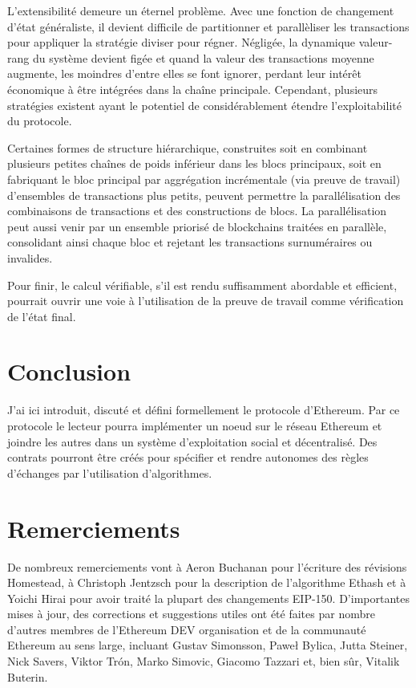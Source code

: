 \documentclass[9pt,oneside]{amsart}
\begin{document}
\begin{multicols}{2}
L'extensibilité demeure un éternel problème. Avec une fonction de changement d'état généraliste, il devient difficile de partitionner et parallèliser les transactions pour appliquer la stratégie diviser pour régner. Négligée, la dynamique valeur-rang du système devient figée et quand la valeur des transactions moyenne augmente, les moindres d'entre elles se font ignorer, perdant leur intérêt économique à être intégrées dans la chaîne principale. Cependant, plusieurs stratégies existent ayant le potentiel de considérablement étendre l'exploitabilité du protocole.

Certaines formes de structure hiérarchique, construites soit en combinant plusieurs petites chaînes de poids inférieur dans les blocs principaux, soit en fabriquant le bloc principal par aggrégation incrémentale (via preuve de travail) d'ensembles de transactions plus petits, peuvent permettre la parallélisation des combinaisons de transactions et des constructions de blocs. La parallélisation peut aussi venir par un ensemble priorisé de blockchains traitées en parallèle, consolidant ainsi chaque bloc et rejetant les transactions surnuméraires ou invalides.

Pour finir, le calcul vérifiable, s'il est rendu suffisamment abordable et efficient, pourrait ouvrir une voie à l'utilisation de la preuve de travail comme vérification de l'état final.

\section{Conclusion} \label{ch:conclusion}

J'ai ici introduit, discuté et défini formellement le protocole d'Ethereum. Par ce protocole le lecteur pourra implémenter un noeud sur le réseau Ethereum et joindre les autres dans un système d'exploitation social et décentralisé. Des contrats pourront être créés pour spécifier et rendre autonomes des règles d'échanges par l'utilisation d'algorithmes.

\section{Remerciements}

De nombreux remerciements vont à Aeron Buchanan pour l'écriture des révisions Homestead, à Christoph Jentzsch pour la description de l'algorithme Ethash et à Yoichi Hirai pour avoir traité la plupart des changements EIP-150. D'importantes mises à jour, des corrections et suggestions utiles ont été faites par nombre d'autres membres de l'Ethereum DEV organisation et de la communauté Ethereum au sens large, incluant Gustav Simonsson, Pawe\l{} Bylica, Jutta Steiner, Nick Savers, Viktor Tr\'{o}n, Marko Simovic, Giacomo Tazzari et, bien sûr, Vitalik Buterin.




\end{multicols}
\end{document}
